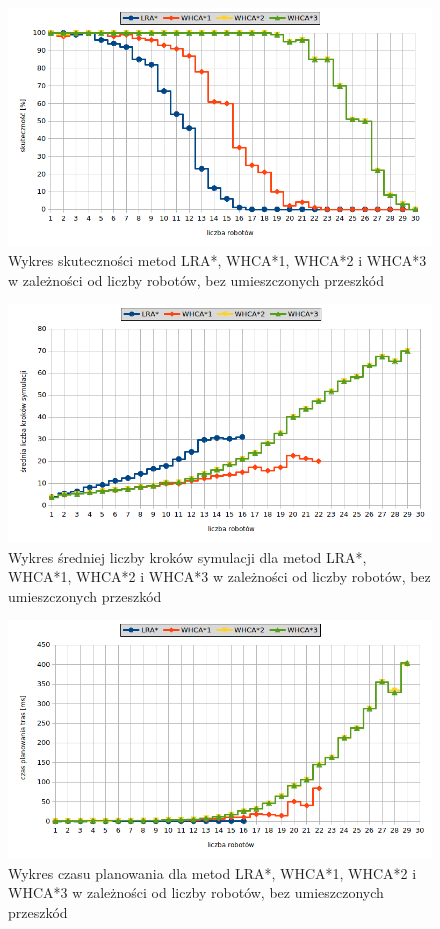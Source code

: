 \begin{figure}
	\centering
	\includegraphics[width=0.8\columnwidth]{img/plots/test-steps-empty-robots-eff}
	\caption{Wykres skuteczności metod LRA*, WHCA*1, WHCA*2 i WHCA*3 w zależności od liczby robotów, bez umieszczonych przeszkód}
	\label{fig:test-steps-empty-robots-eff}
\end{figure}
\begin{figure}
	\centering
	\includegraphics[width=0.8\columnwidth]{img/plots/test-steps-empty-robots-steps}
	\caption{Wykres średniej liczby kroków symulacji dla metod LRA*, WHCA*1, WHCA*2 i WHCA*3 w zależności od liczby robotów, bez umieszczonych przeszkód}
	\label{fig:test-steps-empty-robots-steps}
\end{figure}
\begin{figure}
	\centering
	\includegraphics[width=0.8\columnwidth]{img/plots/test-steps-empty-robots-calctime}
	\caption{Wykres czasu planowania dla metod LRA*, WHCA*1, WHCA*2 i WHCA*3 w zależności od liczby robotów, bez umieszczonych przeszkód}
	\label{fig:test-steps-empty-robots-calctime}
\end{figure}

